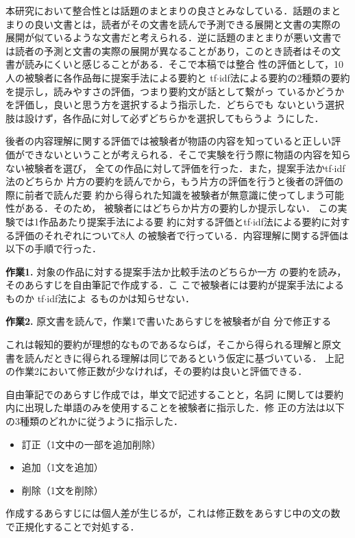 \documentclass[japanese]{jnlp_1.4}
\begin{document}
 本研究において整合性とは話題のまとまりの良さとみなしている．話題のまと
 まりの良い文書とは，読者がその文書を読んで予測できる展開と文書の実際の
 展開が似ているような文書だと考えられる．逆に話題のまとまりが悪い文書で
 は読者の予測と文書の実際の展開が異なることがあり，このとき読者はその文
 書が読みにくいと感じることがある．そこで本稿では整合
 性の評価として，10人の被験者に各作品毎に提案手法による要約と
 tf$\cdot$idf法による要約の2種類の要約を提示し，読みやすさの評価，つまり要約文が話として繋がっ
 ているかどうかを評価し，良いと思う方を選択するよう指示した．どちらでも
 ないという選択肢は設けず，各作品に対して必ずどちらかを選択してもらうよ
 うにした．

 後者の内容理解に関する評価では被験者が物語の内容を知っていると正しい評
 価ができないということが考えられる．そこで実験を行う際に物語の内容を知らない被験者を選び，
 全ての作品に対して評価を行った．また，提案手法かtf$\cdot$idf法のどちらか
 片方の要約を読んでから，もう片方の評価を行うと後者の評価の際に前者で読んだ要
 約から得られた知識を被験者が無意識に使ってしまう可能性がある．そのため，
 被験者にはどちらか片方の要約しか提示しない．
 この実験では1作品あたり提案手法による要
 約に対する評価とtf$\cdot$idf法による要約に対する評価のそれぞれについて8人
 の被験者で行っている．内容理解に関する評価は以下の手順で行った．

 \begin{list}{}{}
  \item[{\bf 作業1.}] 対象の作品に対する提案手法か比較手法のどちらか一方
		      の要約を読み，そのあらすじを自由筆記で作成する．こ
		      こで被験者には要約が提案手法によるものか
		      tf$\cdot$idf法によ
		      るものかは知らせない．
  \item[{\bf 作業2.}] 原文書を読んで，作業1で書いたあらすじを被験者が自
		      分で修正する
 \end{list}

 これは報知的要約が理想的なものであるならば，そこから得られる理解と原文
 書を読んだときに得られる理解は同じであるという仮定に基づいている． 上記
 の作業2において修正数が少なければ，その要約は良いと評価できる．

 自由筆記でのあらすじ作成では，単文で記述することと，名詞
 に関しては要約内に出現した単語のみを使用することを被験者に指示した．修
 正の方法は以下の3種類のどれかに従うように指示した．
 \begin{itemize}
  \item 訂正（1文中の一部を追加削除）
  \item 追加（1文を追加）
  \item 削除（1文を削除）
 \end{itemize}
 作成するあらすじには個人差が生じるが，これは修正数をあらすじ中の文の数
 で正規化することで対処する．
\end{document}
